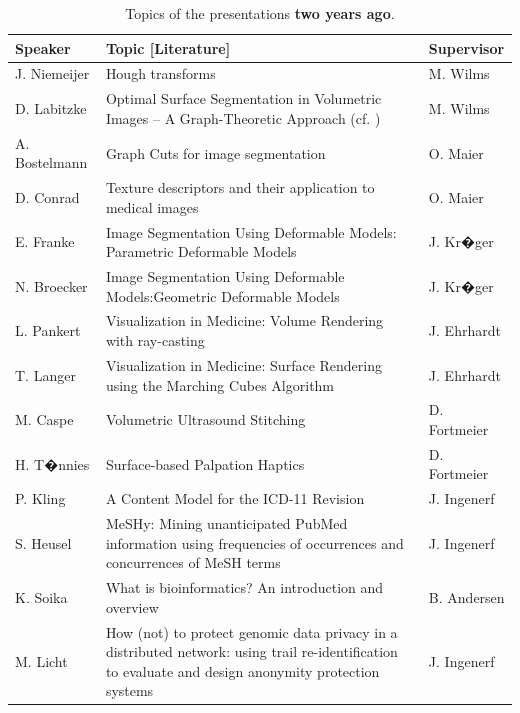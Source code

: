 \documentclass[
12pt,
headsepline,
bibliography=totoc,
twoside=semi,
fleqn
]{scrartcl}
\begin{document}


\begin{table}[t]
    \footnotesize
    \caption{\label{tab:table1} Topics of the presentations \textbf{two years ago}.}
    \vspace{1ex}
    \centering 
    \begin{tabular}{p{2.5cm}p{8.7cm}p{2.8cm}}
        \toprule
        \textbf{Speaker} & \textbf{Topic [Literature]} & \textbf{Supervisor} \\
        \midrule
        J. Niemeijer & Hough transforms & M. Wilms \\
        D. Labitzke & Optimal Surface Segmentation in Volumetric Images -- A Graph-Theoretic Approach (cf. \citep{Li_TPAMI_2006}) & M. Wilms \\
        A. Bostelmann & Graph Cuts for image segmentation
        & O. Maier \\
        D. Conrad & Texture descriptors and their application to medical images & O. Maier
        \\
        E. Franke & Image Segmentation Using Deformable Models: Parametric Deformable
        Models & J. Kr�ger \\
        N. Broecker & Image Segmentation Using Deformable Models:Geometric Deformable
        Models & J. Kr�ger \\
        L. Pankert & Visualization in Medicine: Volume Rendering with ray-casting
        & J. Ehrhardt \\
        T. Langer & Visualization in Medicine: Surface Rendering using the Marching Cubes
        Algorithm & J. Ehrhardt \\
        M. Caspe & Volumetric Ultrasound Stitching & D. Fortmeier \\
        H. T�nnies & Surface-based Palpation Haptics & D. Fortmeier \\
        \midrule
        P. Kling & A Content Model for the ICD-11 Revision & J. Ingenerf \\
        S. Heusel & MeSHy: Mining unanticipated PubMed information using frequencies of
        occurrences and concurrences of MeSH terms & J. Ingenerf \\
        K. Soika & What is bioinformatics? An introduction and overview & B. Andersen \\
        M. Licht & How (not) to protect genomic data privacy in a distributed network: using trail
        re-identification to evaluate and design anonymity protection systems & J. Ingenerf \\

\end{tabular}
\end{table}
\end{document}
